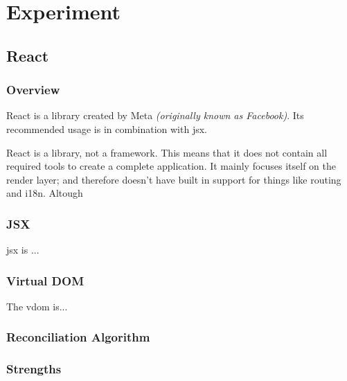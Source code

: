 \chapter{Experiment}


\section{React}
\label{sec:experiment:react}

\subsection{Overview}
\label{subsec:experiment:react:overview}

React is a \gls{library} created by Meta \textit{(originally known as Facebook)}. Its recommended usage is in combination with \acrshort{jsx}. 

\vspace{1cm}

React is a library, not a framework. This means that it does not contain all required tools to create a complete application. It mainly focuses itself on the render layer; and therefore doesn't have built in support for things like routing and \acrshort{i18n}. Altough

\subsection{JSX}
\label{subsec:jsx}

\acrfull{jsx} is ...

\subsection{Virtual DOM}
\label{subsec:vdom}

The \acrshort{vdom} is...


\subsection{Reconciliation Algorithm}
\label{subsec:experiment:react:reconciliation_algorithm}


\subsection{Strengths}
\label{subsec:experiment:react:strengths}

